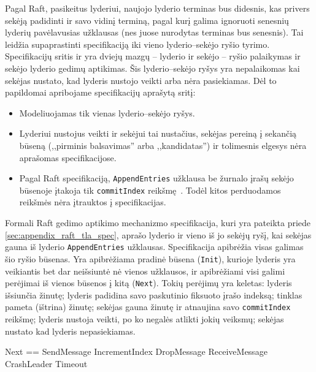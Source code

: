 \documentclass{VUMIFPSkursinis}
\begin{document}
Pagal Raft, pasikeitus lyderiui, naujojo lyderio terminas bus didesnis, kas privers sekėją padidinti ir savo vidinį terminą, pagal kurį galima ignoruoti senesnių lyderių pavėlavusias užklausas (nes juose nurodytas terminas bus senesnis). Tai leidžia supaprastinti specifikaciją iki vieno lyderio--sekėjo ryšio tyrimo. Specifikacijų sritis ir yra dviejų mazgų -- lyderio ir sekėjo -- ryšio palaikymas ir sekėjo lyderio gedimų aptikimas. Šis lyderio--sekėjo ryšys yra nepalaikomas kai sekėjas nustato, kad lyderis nustojo veikti arba nėra pasiekiamas. Dėl to papildomai apribojame specifikacijų aprašytą sritį:

\begin{itemize}
\item Modeliuojamas tik vienas lyderio--sekėjo ryšys.
\item Lyderiui nustojus veikti ir sekėjui tai nustačius, sekėjas pereiną į sekančią būseną (,,pirminis balsavimas'' arba ,,kandidatas'') ir tolimesnis elgesys nėra aprašomas specifikacijose.
\item Pagal Raft specifikaciją, \texttt{AppendEntries} užklausa be žurnalo įrašų sekėjo būsenoje įtakoja tik \texttt{commitIndex} reikšmę~\cite{ongaro_consensus}. Todėl kitos perduodamos reikšmės nėra įtrauktos į specifikacijas. 
\end{itemize}

Formali Raft gedimo aptikimo mechanizmo specifikacija, kuri yra pateikta priede \ref{sec:appendix_raft_tla_spec}, aprašo lyderio ir vieno iš jo sekėjų ryšį, kai sekėjas gauna iš lyderio \texttt{AppendEntries} užklausas. Specifikacija apibrėžia visas galimas šio ryšio būsenas. Yra apibrėžiama pradinė būsena (\texttt{Init}), kurioje lyderis yra veikiantis bet dar neišsiuntė nė vienos užklausos, ir apibrėžiami visi galimi perėjimai iš vienos būsenos į kitą (\texttt{Next}). Tokių perėjimų yra keletas: lyderis išsiunčia žinutę; lyderis padidina savo paskutinio fiksuoto įrašo indeksą; tinklas pameta (ištrina) žinutę; sekėjas gauna žinutę ir atnaujina savo \texttt{commitIndex} reikšmę; lyderis nustoja veikti, po ko negalės atlikti jokių veiksmų; sekėjas nustato kad lyderis nepasiekiamas. 

\begin{adjustwidth}{2cm}{}

\begin{tla}
Next == \/ SendMessage
        \/ IncrementIndex
        \/ DropMessage
        \/ ReceiveMessage
        \/ CrashLeader
        \/ Timeout
\end{tla}
\begin{tlatex}
\@pvspace{8.0pt}%
%
%
%
%
%
%
\@pvspace{8.0pt}%
\end{tlatex}

\end{adjustwidth}
\end{document}
